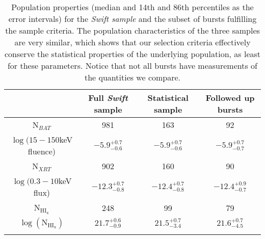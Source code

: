 \begin{table*}[!ht]
	\centering
	\begin{tabular}{cccc}
		\hline
		\hline\noalign{\smallskip}
		{} & {Full \textit{Swift} sample} & {Statistical sample} &  {Followed up bursts} \\
		\hline\noalign{\smallskip}
		N$_{BAT}$ & 981 & 163 & 92\\
		$\log(15-150$keV fluence)  & $-5.9_{-0.6}^{+0.7}$ &  $-5.9_{-0.6}^{+0.7}$ &  $-5.9_{-0.7}^{+0.7}$   \\
		N$_{XRT}$ & 902 & 160 & 90\\
		$\log(0.3-10$keV flux) & $-12.3_{-0.8}^{+0.7}$ &  $-12.4_{-0.8}^{+0.7}$ &  $-12.4_{-0.7}^{+0.9}$  \\
		N$_{\mathrm{HI_x}}$ & 248 & 99 & 79\\
		$\log(\mathrm{N}_{\mathrm{HI_x}})$ & $21.7_{-0.9}^{+0.6}$ &  $21.5_{-3.4}^{+0.7}$ &  $21.6_{-4.5}^{+0.7}$  \\
		\hline\noalign{\smallskip}

\end{tabular} 

\caption{
	Population properties (median and 14th and 86th percentiles as the
	error intervals) for the \textit{Swift sample} and the subset of bursts
	fulfilling the sample criteria. The population characteristics of the three
	samples are very similar, which shows that our selection criteria effectively
	conserve the statistical properties of the underlying population, as least for
	these parameters.  Notice that not all bursts have measurements of the
	quantities we compare. \label{tab:sample_properties}
	}

\end{table*}